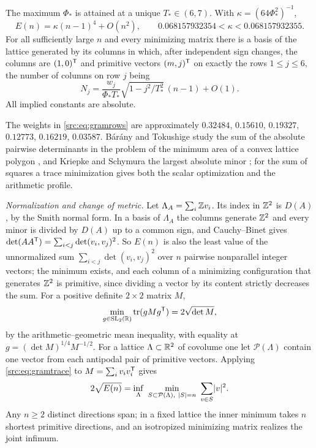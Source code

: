\begin{theorem}\label{src:thm:gramasym}
The maximum $\Phi_*$ is attained at a unique $T_*\in(6,7)$. With $\kappa=(64\Phi_*^2)^{-1}$,
\begin{equation}\label{src:eq:gramasym}
 E(n)=\kappa(n-1)^4+O(n^2),\qquad0.068157932354<\kappa<0.068157932355 .
\end{equation}
For all sufficiently large $n$ and every minimizing matrix there is a basis of the lattice generated by its
columns in which, after independent sign changes, the columns are $(1,0)^{\mathsf{T}}$ and primitive vectors
$(m,j)^{\mathsf{T}}$ on exactly the rows $1\le j\le6$, the number of columns on row $j$ being
\begin{equation}\label{src:eq:gramrows}
 N_j=\frac{w_j}{\Phi_*T_*}\sqrt{1-j^2/T_*^2}\,(n-1)+O(1).
\end{equation}
All implied constants are absolute.
\end{theorem}

The weights in \eqref{src:eq:gramrows} are approximately $0.32484$, $0.15610$, $0.19327$, $0.12773$,
$0.16219$, $0.03587$. B\'ar\'any and Tokushige study the sum of the absolute pairwise determinants in the
problem of the minimum area of a convex lattice polygon \cite{BaranyTokushige2004Minimum}, and Kriepke and
Schymura the largest absolute minor \cite{KriepkeSchymura2025Generic}; for the sum of squares a trace
minimization gives both the scalar optimization and the arithmetic profile.

\emph{Normalization and change of metric.} Let $\Lambda_A=\sum_i\mathbb{Z} v_i$. Its index in $\mathbb{Z}^2$ is $D(A)$, by
the Smith normal form. In a basis of $\Lambda_A$ the columns generate $\mathbb{Z}^2$ and every minor is divided by
$D(A)$ up to a common sign, and Cauchy--Binet gives $\det(AA^{\mathsf{T}})=\sum_{i<j}\det(v_i,v_j)^2$. So $E(n)$
is also the least value of the unnormalized sum $\sum_{i<j}\det(v_i,v_j)^2$ over $n$ pairwise nonparallel
integer vectors; the minimum exists, and each column of a minimizing configuration that generates $\mathbb{Z}^2$ is
primitive, since dividing a vector by its content strictly decreases the sum. For a positive definite
$2\times2$ matrix $M$,
\begin{equation}\label{src:eq:gramtrace}
 \min_{g\in\operatorname{SL}_2(\mathbb{R})}\operatorname{tr}(gMg^{\mathsf{T}})=2\sqrt{\det M},
\end{equation}
by the arithmetic--geometric mean inequality, with equality at $g=(\det M)^{1/4}M^{-1/2}$. For a lattice
$\Lambda\subset\mathbb{R}^2$ of covolume one let $\mathcal P(\Lambda)$ contain one vector from each antipodal pair
of primitive vectors. Applying \eqref{src:eq:gramtrace} to $M=\sum_iv_iv_i^{\mathsf{T}}$ gives
\begin{equation}\label{src:eq:grammin}
 2\sqrt{E(n)}=\inf_\Lambda\ \min_{S\subset\mathcal P(\Lambda),\ \lvert S\rvert=n}\ \sum_{v\in S}\lvert v\rvert^2 .
\end{equation}
Any $n\ge2$ distinct directions span; in a fixed lattice the inner minimum takes $n$ shortest primitive
directions, and an isotropized minimizing matrix realizes the joint infimum.

